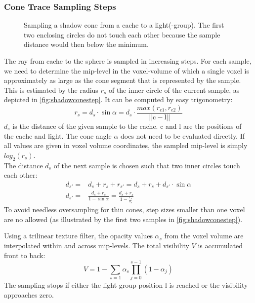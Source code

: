 \documentclass[thesis.tex]{subfiles}
\begin{document}
\subsubsection{Cone Trace Sampling Steps}
\begin{figure}[h]
	\centering
	\caption{Sampling a shadow cone from a cache to a light(-group). The first two enclosing circles do not touch each other because the sample distance would then below the minimum.} \label{fig:shadowconestep}
\end{figure}
The ray from cache to the sphere is sampled in increasing steps.
For each sample, we need to determine the mip-level in the voxel-volume of which a single voxel is approximately as large as the cone segment that is represented by the sample.
This is estimated by the radius $r_s$ of the inner circle of the current sample, as depicted in \autoref{fig:shadowconestep}.
It can be computed by easy trigonometry:
\begin{equation}
r_s = d_s \cdot \sin \alpha = d_s \cdot \frac{max(r_{e1}, r_{e2})}{||\mathrm{c} - \mathrm{l}||}
\end{equation}
$d_s$ is the distance of the given sample to the cache. $\mathrm{c}$ and $\mathrm{l}$ are the positions of the cache and light.
The cone angle $\alpha$ does not need to be evaluated directly. %
If all values are given in voxel volume coordinates, the sampled mip-level is simply $log_2(r_s)$.\\
The distance $d_s$ of the next sample is chosen such that two inner circles touch each other:
\begin{align}
d_{s'} =& d_s + r_s + r_{s'} = d_s + r_s + d_{s'} \cdot \sin \alpha\\
d_{s'} =& \frac{d_s + r_s}{1-\sin\alpha} = \frac{d_s + r_s}{1-\frac{r_s}{d_s}} 
\end{align}
To avoid needless oversampling for thin cones, step sizes smaller than one voxel are no allowed (as illustrated by the first two samples in \autoref{fig:shadowconestep}).

Using a trilinear texture filter, the opacity values $\alpha_s$ from the voxel volume are interpolated within and across mip-levels.
The total visibility $V$ is accumulated front to back:
\begin{equation}
V = 1 - \sum\limits_{s=1}\alpha_s \prod\limits_{j=0}^{s-1}(1-\alpha_j)
\end{equation}
The sampling stops if either the light group position $\mathrm{l}$ is reached or the visibility approaches zero.
\end{document}
